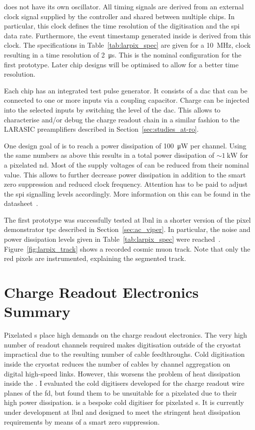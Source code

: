 \larpix{} does not have its own oscillator.
All timing signals are derived from an external clock signal supplied by the controller and shared between multiple chips.
In particular, this clock defines the time resolution of the digitisation and the \gls{spi} data rate.
Furthermore, the event timestamp generated inside \larpix{} is derived from this clock.
The specifications in Table~\ref{tab:larpix_spec} are given for a \SI{10}{\mega\hertz}, clock resulting in a time resolution of \SI{2}{\micro\second}.
This is the nominal configuration for the first prototype.
Later chip designs will be optimised to allow for a better time resolution.

Each \larpix{} chip has an integrated test pulse generator.
It consists of a \gls{dac} that can be connected to one or more inputs via a coupling capacitor.
Charge can be injected into the selected inputs by switching the level of the \gls{dac}.
This allows to characterise and/or debug the charge readout chain in a similar fashion to the LARASIC preamplifiers described in Section~\ref{sec:studies_at-ro}.

One design goal of \larpix{} is to reach a power dissipation of \SI{100}{\micro\watt} per channel.
Using the same numbers as above this results in a total power dissipation of $\sim \SI{1}{\kilo\watt}$ for a pixelated \dune{} \gls{nd}.
Most of the supply voltages of \larpix{} can be reduced from their nominal value.
This allows to further decrease power dissipation in addition to the smart zero suppression and reduced clock frequency.
Attention has to be paid to adjust the \gls{spi} signalling levels accordingly.
More information on this can be found in the datasheet~\cite{larpix_spec}.

The first \larpix{} prototype was successfully tested at \gls{lbnl} in a shorter version of the pixel demonstrator \gls{tpc} described in Section~\ref{sec:ac_viper}.
In particular, the noise and power dissipation levels given in Table~\ref{tab:larpix_spec} were reached~\cite{dan_larpix_duneCM}.
Figure~\ref{fig:larpix_track} shows a recorded cosmic muon track.
Note that only the red pixels are instrumented, explaining the segmented track.

\section{Charge Readout Electronics Summary}
\label{sec:studies_electronics-summary}

Pixelated \lartpc{}s place high demands on the charge readout electronics.
The very high number of readout channels required makes digitisation outside of the cryostat impractical due to the resulting number of cable feedthroughs.
Cold digitisation inside the cryostat reduces the number of cables by channel aggregation on digital high-speed links.
However, this worsens the problem of heat dissipation inside the \lar{}.
I evaluated the cold digitisers developed for the charge readout wire planes of the \dune{} \gls{fd}, but found them to be unsuitable for a pixelated \lartpc{} due to their high power dissipation.
\larpix{} is a bespoke cold digitiser for pixelated \lartpc{}s.
It is currently under development at \gls{lbnl} and designed to meet the stringent heat dissipation requirements by means of a smart zero suppression.